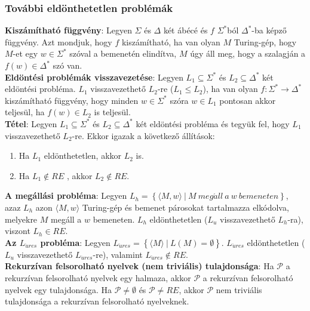 \documentclass[margin=0px]{article}
\begin{document}
\subsubsection{További eldönthetetlen problémák}

\noindent \textbf{Kiszámítható függvény}: Legyen $\Sigma$ és $\Delta$ két ábécé és $f$ $\Sigma^{*}$ból
$\Delta^{*}$-ba képző függvény. Azt mondjuk, hogy $f$ kiszámítható, ha van olyan $M$ Turing-gép, hogy
$M$-et egy $w \in \Sigma^{*}$ szóval a bemenetén elindítva, $M$ úgy áll meg, hogy a szalagján a
$f(w) \in \Delta^{*}$ szó van.\\

\noindent \textbf{Eldöntési problémák visszavezetése}: Legyen $L_{1} \subseteq \Sigma^{*}$ és $L_{2} \subseteq \Delta^{*}$
két eldöntési probléma. $L_{1}$ visszavezethető $L_{2}$-re ($L_{1} \leq L_{2}$), ha van olyan
$f : \Sigma^{*} \to \Delta^{*}$ kiszámítható függvény, hogy minden $w \in \Sigma^{*}$ szóra
$w \in L_{1}$ pontosan akkor teljesül, ha $f(w) \in L_{2}$ is teljesül.\\

\noindent \textbf{Tétel}: Legyen $L_{1} \subseteq \Sigma^{*}$ és $L_{2} \subseteq \Delta^{*}$
két eldöntési probléma és tegyük fel, hogy $L_{1}$ visszavezethető $L_{2}$-re. Ekkor igazak a következő állítások:

\begin{enumerate}
    \item	Ha $L_{1}$ eldönthetetlen, akkor $L_{2}$ is.

    \item	Ha $L_{1} \notin RE$ , akkor $L_{2} \notin RE$.
\end{enumerate}

\noindent \textbf{A megállási probléma}: Legyen $L_{h} = \left\{\langle M, w \rangle \ |\ M \ meg\acute{a}ll \ a \ w \ bemeneten \right\}$,
azaz $L_{h}$ azon $\langle M, w \rangle$ Turing-gép és bemenet párosokat tartalmazza elkódolva, melyekre $M$ megáll a $w$ bemeneten.
$L_{h}$ eldönthetetlen ($L_{u}$ visszavezethető $L_{h}$-ra), viszont $L_{h} \in RE$.\\

\noindent \textbf{Az $L_{\ddot{u}res}$ probléma}: Legyen $L_{\ddot{u}res} = \left\{\langle M \rangle \ |\ L(M) = \emptyset \right\}$.
$L_{\ddot{u}res}$ eldönthetetlen ($L_{u}$ visszavezethető $L_{\ddot{u}res}$-re), valamint $L_{\ddot{u}res} \notin RE$.\\

\noindent \textbf{Rekurzívan felsorolható nyelvek (nem triviális) tulajdonsága}: Ha $\mathcal{P}$ a rekurzívan felsorolható
nyelvek egy halmaza, akkor $\mathcal{P}$ a rekurzívan felsorolható nyelvek egy tulajdonsága. Ha $\mathcal{P} \not = \emptyset$ és
$\mathcal{P} \not = RE$, akkor $\mathcal{P}$ nem triviális tulajdonsága a rekurzívan felsorolható nyelveknek.\\
\end{document}
